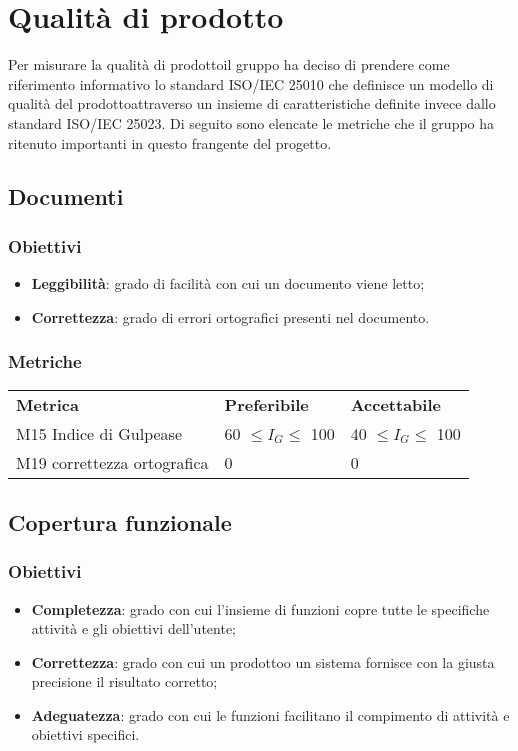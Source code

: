 \section{Qualità di prodotto}
    Per misurare la qualità di prodotto\glosp il gruppo ha deciso di prendere come riferimento informativo lo standard ISO/IEC 25010 che definisce un modello di qualità del prodotto\glosp attraverso un insieme di caratteristiche definite invece dallo standard ISO/IEC 25023. Di seguito sono elencate le metriche che il gruppo ha ritenuto importanti in questo frangente del progetto\glo.
    \subsection{Documenti}
    	\subsubsection{Obiettivi}
    		\begin{itemize}
    			\item \textbf{Leggibilità}: grado di facilità con cui un documento viene letto;
    			\item \textbf{Correttezza}: grado di errori ortografici presenti nel documento.
    		\end{itemize}
	    \subsubsection{Metriche}
	    \begin{longtable} {
	    		>{}p{80mm} 
	    		>{}p{25mm}
	    		>{}p{25mm}
	    	}
	    	\rowcolor{gray!50}
	    	\textbf{Metrica} & \textbf{Preferibile} & \textbf{Accettabile} \TBstrut \TBstrut \\
	    	M15 Indice di Gulpease & 60 $\le I_{G} \le$ 100 & 40 $\le I_{G} \le$ 100 \TBstrut \\ [2mm]
	    	M19 correttezza ortografica & 0 & 0 \TBstrut \\ [2mm]
	    \end{longtable}

    \subsection{Copertura funzionale}
        \subsubsection{Obiettivi}
            \begin{itemize}
                \item \textbf{Completezza}: grado con cui l'insieme di funzioni copre tutte le specifiche attività e gli obiettivi dell'utente;
                \item \textbf{Correttezza}: grado con cui un prodotto\glosp o un sistema fornisce con la giusta precisione il risultato corretto;
                \item \textbf{Adeguatezza}: grado con cui le funzioni facilitano il compimento di attività e obiettivi specifici.
            \end{itemize}
